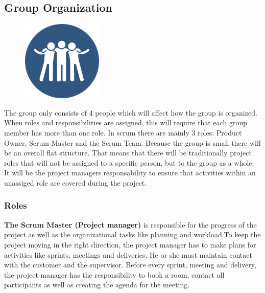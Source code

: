 \clearpage
\subsection{Group Organization}

\begin{figure}
  \begin{center}
  \includegraphics[scale=0.7]{pictures/team.png}
  \end{center}
\end{figure}

The group only consists of 4 people which will affect how the group is organized. When roles and responsibilities are assigned, this will require that each group member has more than one role. In scrum there are mainly 3 roles: Product Owner, Scrum Master and the Scrum Team. Because the group is small there will be an overall flat structure. That means that
there will be traditionally project roles that will not be assigned to a specific person, but to the group as a whole. It will be the project managers responsability to ensure that activities within an unassiged role are covered during the project.

\subsubsection{Roles}

{\bf The Scrum Master (Project manager)} is responsible for the progress of the project as well as the organizational tasks like planning and workload.To keep the project moving in the right direction, the project manager has to make plans for activities like sprints, meetings and deliveries. He or she must maintain contact with the customer and the supervisor.
Before every sprint, meeting and delivery, the project manager has the responsibility to book a room, contact all
participants as well as creating the agenda for the meeting. \\

